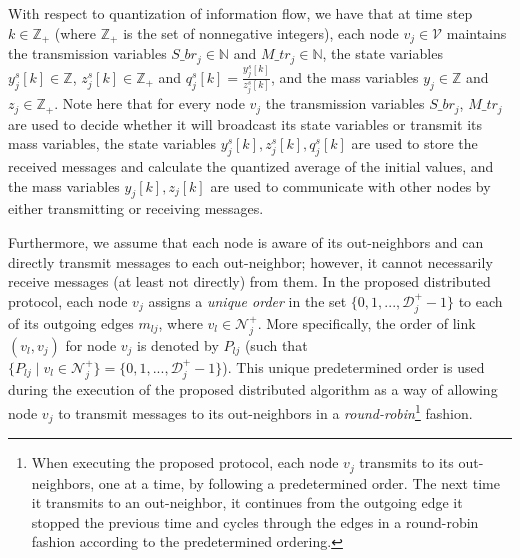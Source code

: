 \documentclass[twocolumn]{autart}    %
\let\mathbb=\mathds %
\newcommand{\todo}[1]{\textcolor{red}{{#1}}}
\begin{document}
With respect to quantization of information flow, we have that at time step $k \in \mathbb{Z}_+$ (where $\mathbb{Z}_+$ is the set of nonnegative integers), each node $v_j \in \mathcal{V}$ maintains the transmission variables $S\_br_j \in \mathbb{N}$ and $M\_tr_j \in \mathbb{N}$, the state variables $y^s_j[k] \in \mathbb{Z}$, $z^s_j[k] \in \mathbb{Z}_+$ and $q_j^s[k] = \frac{y_j^s[k]}{z_j^s[k]}$, and the mass variables $y_j \in \mathbb{Z}$ and $z_j \in \mathbb{Z}_+$. 
Note here that for every node $v_j$ the transmission variables $S\_br_j$, $M\_tr_j$ are used to decide whether it will broadcast its state variables or transmit its mass variables, the state variables $y^s_j[k], z^s_j[k], q_j^s[k]$ are used to store the received messages and calculate the quantized average of the initial values, and the mass variables $y_j[k], z_j[k]$ are used to communicate with other nodes by either transmitting or receiving messages.

Furthermore, we assume that each node is aware of its out-neighbors and can directly transmit messages to each out-neighbor; however, it cannot necessarily receive messages (at least not directly) from them. 
In the proposed distributed protocol, each node $v_j$ assigns a \textit{unique order} in the set $\{0,1,..., \mathcal{D}_j^+ -1\}$ to each of its outgoing edges $m_{lj}$, where $v_l \in \mathcal{N}^+_j$. 
More specifically, the order of link $(v_l,v_j)$ for node $v_j$ is denoted by $P_{lj}$ (such that $\{P_{lj} \; | \; v_l \in \mathcal{N}^+_j\} = \{0,1,..., \mathcal{D}_j^+ -1\}$). 
This unique predetermined order is used during the execution of the proposed distributed algorithm as a way of allowing node $v_j$ to transmit messages to its out-neighbors in a \textit{round-robin}\footnote{When executing the proposed protocol, each node $v_j$ transmits to its out-neighbors, one at a time, by following a predetermined order. The next time it transmits to an out-neighbor, it continues from the outgoing edge it stopped the previous time and cycles through the edges in a round-robin fashion according to the predetermined ordering.} fashion. 
\end{document}
